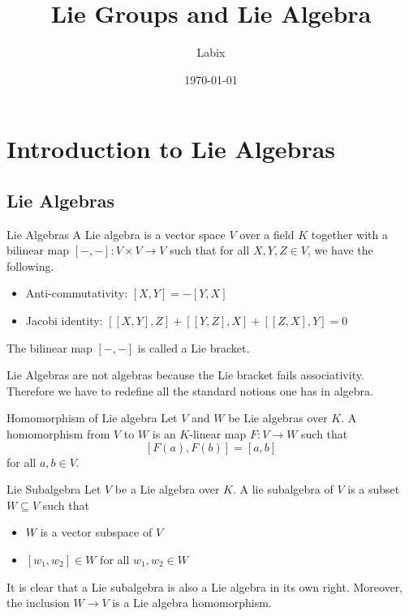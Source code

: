 \documentclass[a4paper]{article}
\title{Lie Groups and Lie Algebra}
\author{Labix}
\date{\today}
\begin{document}
\maketitle
\begin{abstract}
\end{abstract}
\pagebreak
\tableofcontents
\pagebreak

\section{Introduction to Lie Algebras}
\subsection{Lie Algebras}
\begin{defn}{Lie Algebras}{} A Lie algebra is a vector space $V$ over a field $K$ together with a bilinear map $[-,-]:V\times V\to V$ such that for all $X,Y,Z\in V$, we have the following. 
\begin{itemize}
\item Anti-commutativity: $[X,Y]=-[Y,X]$
\item Jacobi identity: $[[X,Y],Z]+[[Y,Z],X]+[[Z,X],Y]=0$
\end{itemize}
The bilinear map $[-,-]$ is called a Lie bracket. 
\end{defn}

Lie Algebras are not algebras because the Lie bracket fails associativity. Therefore we have to redefine all the standard notions one has in algebra. 

\begin{defn}{Homomorphism of Lie algebra}{} Let $V$ and $W$ be Lie algebras over $K$. A homomorphism from $V$ to $W$ is an $K$-linear map $F:V\to W$ such that $$[F(a),F(b)]=[a,b]$$ for all $a,b\in V$. 
\end{defn}

\begin{defn}{Lie Subalgebra}{} Let $V$ be a Lie algebra over $K$. A lie subalgebra of $V$ is a subset $W\subseteq V$ such that 
\begin{itemize}
\item $W$ is a vector subspace of $V$
\item $[w_1,w_2]\in W$ for all $w_1,w_2\in W$
\end{itemize}
\end{defn}

It is clear that a Lie subalgebra is also a Lie algebra in its own right. Moreover, the inclusion $W\to V$ is a Lie algebra homomorphism. 
\end{document}
